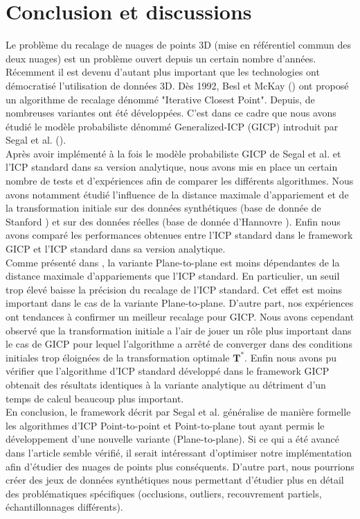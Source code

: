 \section{Conclusion et discussions}

Le problème du recalage de nuages de points 3D (mise en référentiel commun des deux nuages) est un problème ouvert depuis un certain nombre d'années. Récemment il est devenu d'autant plus important que les technologies ont démocratisé l'utilisation de données 3D. Dès 1992, Besl et McKay (\cite{bib_icp}) ont proposé un algorithme de recalage dénommé "Iterative Closest Point". Depuis, de nombreuses variantes ont été développées. C'est dans ce cadre que nous avons étudié le modèle probabiliste dénommé Generalized-ICP (GICP) introduit par Segal et al. (\cite{bib_gicp}).\\

Après avoir implémenté à la fois le modèle probabiliste GICP de Segal et al. et l'ICP standard dans sa version analytique, nous avons mis en place un certain nombre de tests et d'expériences afin de comparer les différents algorithmes. Nous avons notamment étudié l'influence de la distance maximale d'appariement et de la transformation initiale sur des données synthétiques (base de donnée de Stanford \cite{Stanford}) et sur des données réelles (base de donnée d'Hannovre \cite{Hannovr}). Enfin nous avons comparé les performances obtenues entre l'ICP standard dans le framework GICP et l'ICP standard dans sa version analytique.\\

Comme présenté dans \cite{bib_gicp}, la variante Plane-to-plane est moins dépendantes de la distance maximale d'appariements que l'ICP standard. En particulier, un seuil trop élevé baisse la précision du recalage de l'ICP standard. Cet effet est moins important dans le cas de la variante Plane-to-plane. D'autre part, nos expériences ont tendances à confirmer un meilleur recalage pour GICP. Nous avons cependant observé que la transformation initiale a l'air de jouer un rôle plus important dans le cas de GICP pour lequel l'algorithme a arrêté de converger dans des conditions initiales trop éloignées de la transformation optimale $\mathbf{T^{*}}$. Enfin nous avons pu vérifier que l'algorithme d'ICP standard développé dans le framework GICP obtenait des résultats identiques à la variante analytique au détriment d'un temps de calcul beaucoup plus important. \\

En conclusion, le framework décrit par Segal et al. généralise de manière formelle les algorithmes d'ICP Point-to-point et Point-to-plane tout ayant permis le développement d'une nouvelle variante (Plane-to-plane). Si ce qui a été avancé dans l'article semble vérifié, il serait intéressant d'optimiser notre implémentation afin d'étudier des nuages de points plus conséquents. D'autre part, nous pourrions créer des jeux de données synthétiques nous permettant d'étudier plus en détail des problématiques spécifiques (occlusions, outliers, recouvrement partiels, échantillonnages différents).
